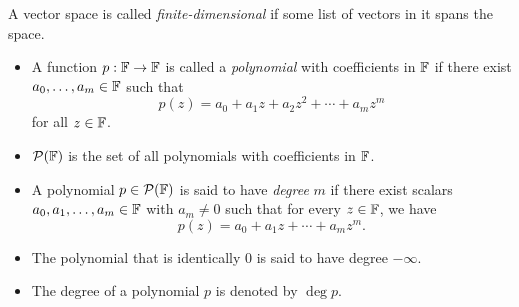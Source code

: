\begin{definition}
	A vector space is called \textit{finite-dimensional} if some list of vectors in it spans the space.
\end{definition}
\begin{definition}[Polynomial] \mbox{}
	\begin{itemize}
		\item A function $p: \mathbb{F} \to \mathbb{F}$ is called a \textit{polynomial} with coefficients in $\mathbb{F}$ if there exist $a_0, \dots, a_m \in \mathbb{F}$ such that
		\[
		p(z) = a_0 + a_1z + a_2z^2 + \cdots + a_mz^m
		\]
		for all $z \in \mathbb{F}$.
		\item $\mathcal{P}(\mathbb{F})$ is the set of all polynomials with coefficients in $\mathbb{F}$.
	\end{itemize}
\end{definition}
\begin{definition} \mbox{}
	\begin{itemize}
		\item A polynomial $p \in \mathcal{P}(\mathbb{F})$ is said to have \textit{degree} $m$ if there exist scalars $a_0, a_1, \dots, a_m \in \mathbb{F}$ with $a_m \neq 0$ such that for every $z \in \mathbb{F}$, we have
		\[
		p(z) = a_0 + a_1z + \cdots + a_mz^m.
		\]
		\item The polynomial that is identically $0$ is said to have degree $-\infty$. 
		\item The degree of a polynomial $p$ is denoted by $\deg p$.
	\end{itemize}
\end{definition}
